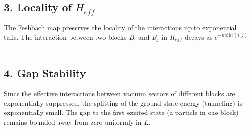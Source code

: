\subsection{3. Locality of $H_{eff}$}
The Feshbach map preserves the locality of the interactions up to exponential tails. The interaction between two blocks $B_i$ and $B_j$ in $H_{eff}$ decays as $e^{-m \text{dist}(i,j)}$.

\subsection{4. Gap Stability}
Since the effective interactions between vacuum sectors of different blocks are exponentially suppressed, the splitting of the ground state energy (tunneling) is exponentially small. The gap to the first excited state (a particle in one block) remains bounded away from zero uniformly in $L$.
